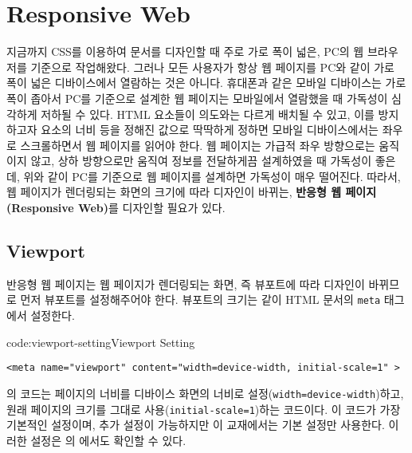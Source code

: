 \section{Responsive Web} \label{sect:responsive-web}

지금까지 CSS를 이용하여 문서를 디자인할 때 주로 가로 폭이 넓은, PC의 웹 브라우저를 기준으로 작업해왔다. 그러나 모든 사용자가 항상 웹 페이지를 PC와 같이 가로 폭이 넓은 디바이스에서 열람하는 것은 아니다. 휴대폰과 같은 모바일 디바이스는 가로 폭이 좁아서 PC를 기준으로 설계한 웹 페이지는 모바일에서 열람했을 때 가독성이 심각하게 저하될 수 있다. HTML 요소들이 의도와는 다르게 배치될 수 있고, 이를 방지하고자 요소의 너비 등을 정해진 값으로 딱딱하게 정하면 모바일 디바이스에서는 좌우로 스크롤하면서 웹 페이지를 읽어야 한다. 웹 페이지는 가급적 좌우 방향으로는 움직이지 않고, 상하 방향으로만 움직여 정보를 전달하게끔 설계하였을 때 가독성이 좋은데, 위와 같이 PC를 기준으로 웹 페이지를 설계하면 가독성이 매우 떨어진다. 따라서, 웹 페이지가 렌더링되는 화면의 크기에 따라 디자인이 바뀌는, \textbf{반응형 웹 페이지(Responsive Web)}를 디자인할 필요가 있다.


\subsection*{Viewport}
반응형 웹 페이지는 웹 페이지가 렌더링되는 화면, 즉 뷰포트에 따라 디자인이 바뀌므로 먼저 뷰포트를 설정해주어야 한다. 뷰포트의 크기는 \과 같이 HTML 문서의 \texttt{meta} 태그에서 설정한다.

\begin{codeenv}{code:viewport-setting}{Viewport Setting}\begin{verbatim}
<meta name="viewport" content="width=device-width, initial-scale=1" >
\end{verbatim}
\end{codeenv}

의 코드는 페이지의 너비를 디바이스 화면의 너비로 설정(\texttt{width=device-width})하고, 원래 페이지의 크기를 그대로 사용(\texttt{initial-scale=1})하는 코드이다. 이 코드가 가장 기본적인 설정이며, 추가 설정이 가능하지만 이 교재에서는 기본 설정만 사용한다. 이러한 설정은 의 에서도 확인할 수 있다.

